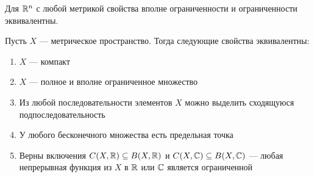 \begin{note}
	Для $\mathbb{R}^n$ с любой метрикой свойства вполне ограниченности и ограниченности эквивалентны.
\end{note}

\begin{theorem}
	Пусть $X$ --- метрическое пространство. Тогда следующие свойства эквивалентны:
	\begin{enumerate}
		\item $X$ --- компакт
		
		\item $X$ --- полное и вполне ограниченное множество
		
		\item Из любой последовательности элементов $X$ можно выделить сходящуюся подпоследовательность
		
		\item У любого бесконечного множества есть предельная точка
		
		\item Верны включения $C(X, \mathbb{R}) \subseteq B(X, \mathbb{R})$ и $C(X, \mathbb{C}) \subseteq B(X, \mathbb{C})$ --- любая непрерывная функция из $X$ в $\mathbb{R}$ или $\mathbb{C}$ является ограниченной
	\end{enumerate}
\end{theorem}